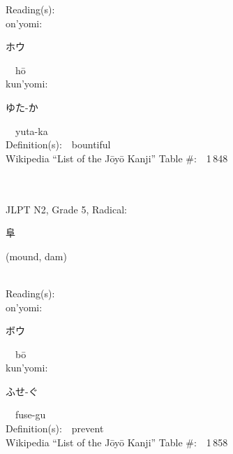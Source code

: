 \begin{multicols}{2}
Reading(s):\ \ \\
{\hspace*{1em}}on'yomi:\ \ \\
{\hspace*{2em}}{\begin{CJK}{UTF8}{min} ホウ \end{CJK}}\ \ h\=o\ \ \\
{\hspace*{1em}}kun'yomi:\ \ \\
{\hspace*{2em}}{\begin{CJK}{UTF8}{min} ゆた-か \end{CJK}}\ \ yuta-ka\ \ \\
Definition(s):\ \ bountiful \\
Wikipedia ``List of the J\=oy\=o Kanji'' Table \#:\ \ 1\,848 \\
\ \ \\
{\fontsize{34pt}{40pt}  }\ \ \\  %
{JLPT N2, Grade 5, Radical:\ \ {\begin{CJK}{UTF8}{min} 阜 \end{CJK}} (mound, dam) } \\
Reading(s):\ \ \\
{\hspace*{1em}}on'yomi:\ \ \\
{\hspace*{2em}}{\begin{CJK}{UTF8}{min} ボウ \end{CJK}}\ \ b\=o\ \ \\
{\hspace*{1em}}kun'yomi:\ \ \\
{\hspace*{2em}}{\begin{CJK}{UTF8}{min} ふせ-ぐ \end{CJK}}\ \ fuse-gu\ \ \\
Definition(s):\ \ prevent \\
Wikipedia ``List of the J\=oy\=o Kanji'' Table \#:\ \ 1\,858 \\
\ \ \\
{\fontsize{34pt}{40pt}  }\ \ \\  %

\end{multicols}
